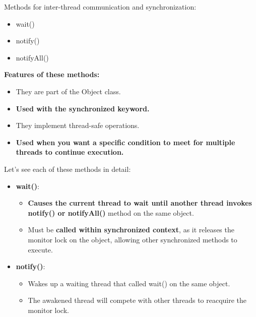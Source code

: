 \setlength{\columnsep}{3pt}
\begin{flushleft}


		Methods for inter-thread communication and synchronization:
		\begin{itemize}
			\item wait()
			\item notify()
			\item notifyAll() 
		\end{itemize}	
		\textbf{Features of these methods:}
		\begin{itemize}
		\item They are part of the Object class.
		\item \textbf{Used with the synchronized keyword.}
		\item They implement thread-safe operations.
		\item \textbf{Used when you want a specific condition to meet for multiple threads to continue execution.}
		\end{itemize}
		
		Let's see each of these methods in detail:
		\begin{itemize}
			\item \textbf{wait()}:
			\begin{itemize}
				\item \textbf{Causes the current thread to wait until another thread invokes notify() or notifyAll()} method on the same object. 
				\item Must be \textbf{called within synchronized context}, as it releases the monitor lock on the object, allowing other synchronized methods to execute.
				\bigskip
			\end{itemize}
			\newpage
			\item \textbf{notify()}:
			\begin{itemize}
				\item Wakes up a waiting thread that called wait() on the same object. 
				\item The awakened thread will compete with other threads to reacquire the monitor lock.
				\bigskip
			\end{itemize}
			

\end{itemize}
\end{flushleft}
